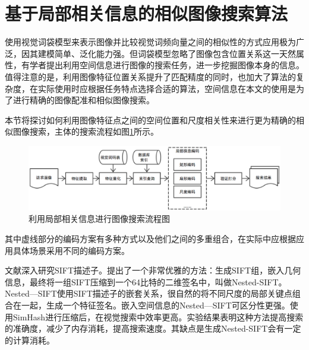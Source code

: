 
\section{基于局部相关信息的相似图像搜索算法}

使用视觉词袋模型来表示图像并比较视觉词频向量之间的相似性的方式应用极为广泛，因其建模简单、泛化能力强。但词袋模型忽略了图像包含位置关系这一天然属性，有学者提出利用空间信息进行图像的搜索任务，进一步挖掘图像本身的信息\cite{Philbin:2007fk,Wu:2009bl,Zhou:2010tv,Zhou:2013jz,Xu:2013wc}。值得注意的是，利用图像特征位置关系提升了匹配精度的同时，也加大了算法的复杂度，在实际使用时应根据任务特点选择合适的算法，空间信息在本文的使用是为了进行精确的图像配准和相似图像搜索。

本节将探讨如何利用图像特征点之间的空间位置和尺度相关性来进行更为精确的相似图像搜索，主体的搜索流程如图\ref{fig:similar_flowchar}所示。

\begin{figure}
\centering\includegraphics[width=16cm]{imgs/ch3/similar_flowchart}
\caption{利用局部相关信息进行图像搜索流程图}
\label{fig:similar_flowchar}
\end{figure}

其中虚线部分的编码方案有多种方式以及他们之间的多重组合，在实际中应根据应用具体场景采用不同的编码方案。

文献\cite{Xu:2013wc}深入研究SIFT描述子。提出了一个非常优雅的方法：生成SIFT组，嵌入几何信息，最终将一组SIFT压缩到一个64比特的二维签名中，叫做Nested-SIFT。Nested—SIFT使用SIFT描述子的嵌套关系，很自然的将不同尺度的局部关键点组合在一起，生成一个特征签名。嵌入空间信息的Nested—SIFT可区分性更强。使用SimHash进行压缩后，在视觉搜索中效率更高。实验结果表明这种方法提高搜索的准确度，减少了内存消耗，提高搜索速度。其缺点是生成Nested-SIFT会有一定的计算消耗。


